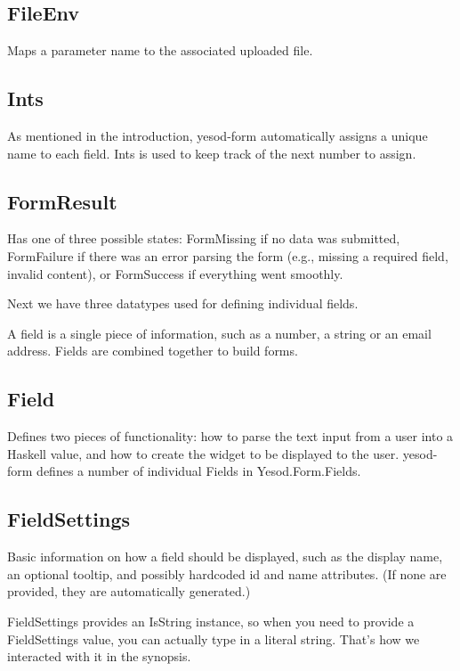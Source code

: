 \subsection{FileEnv}

Maps a parameter name to the associated uploaded file.

\subsection{Ints}

As mentioned in the introduction, yesod-form automatically assigns a unique name to each
field. Ints is used to keep track of the next number to assign.

\subsection{FormResult}

Has one of three possible states: FormMissing if no data was submitted, FormFailure if
there was an error parsing the form (e.g., missing a required field, invalid content), or
FormSuccess if everything went smoothly.

Next we have three datatypes used for defining individual fields.

A field is a single piece of information, such as a number, a string or an email address.
Fields are combined together to build forms.

\subsection{Field}

Defines two pieces of functionality: how to parse the text input from a user into a
Haskell value, and how to create the widget to be displayed to the user. yesod-form
defines a number of individual Fields in Yesod.Form.Fields.

\subsection{FieldSettings}

Basic information on how a field should be displayed, such as the display name, an
optional tooltip, and possibly hardcoded id and name attributes. (If none are provided,
they are automatically generated.)

FieldSettings provides an IsString instance, so when you need to provide a FieldSettings
value, you can actually type in a literal string. That's how we interacted with it in the
synopsis.

